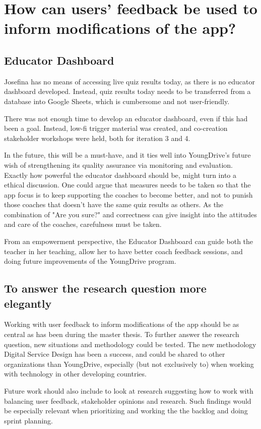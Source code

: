 \section{How can users' feedback be used to inform modifications of the app?}

\subsection{Educator Dashboard}
Josefina has no means of accessing live quiz results today, as there is no educator dashboard developed. Instead, quiz results today needs to be transferred from a database into Google Sheets, which is cumbersome and not user-friendly.

There was not enough time to develop an educator dashboard, even if this had been a goal. Instead, low-fi trigger material was created, and co-creation stakeholder workshops were held, both for iteration 3 and 4.

In the future, this will be a must-have, and it ties well into YoungDrive's future wish of strengthening its quality assurance via monitoring and evaluation. Exactly how powerful the educator dashboard should be, might turn into a ethical discussion. One could argue that measures needs to be taken so that the app focus is to keep supporting the coaches to become better, and not to punish those coaches that doesn't have the same quiz results as others. As the combination of "Are you sure?" and correctness can give insight into the attitudes and care of the coaches, carefulness must be taken.

From an empowerment perspective, the Educator Dashboard can guide both the teacher in her teaching, allow her to have better coach feedback sessions, and doing future improvements of the YoungDrive program.

\subsection{To answer the research question more elegantly}
Working with user feedback to inform modifications of the app should be as central as has been during the master thesis. To further answer the research question, new situations and methodology could be tested. The new methodology Digital Service Design has been a success, and could be shared to other organizations than YoungDrive, especially (but not exclusively to) when working with technology in other developing countries.

Future work should also include to look at research suggesting how to work with balancing user feedback, stakeholder opinions and research. Such findings would be especially relevant when prioritizing and working the the backlog and doing sprint planning.

